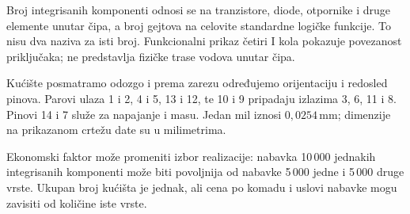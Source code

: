 
Broj integrisanih komponenti odnosi se na tranzistore, diode, otpornike i druge elemente unutar čipa, a broj gejtova na celovite standardne logičke funkcije. To nisu dva naziva za isti broj. Funkcionalni prikaz četiri I kola pokazuje povezanost priključaka; ne predstavlja fizičke trase vodova unutar čipa.

Kućište posmatramo odozgo i prema zarezu određujemo orijentaciju i redosled pinova. Parovi ulaza 1 i 2, 4 i 5, 13 i 12, te 10 i 9 pripadaju izlazima 3, 6, 11 i 8. Pinovi 14 i 7 služe za napajanje i masu. Jedan mil iznosi \(0{,}0254\,\mathrm{mm}\); dimenzije na prikazanom crtežu date su u milimetrima.

Ekonomski faktor može promeniti izbor realizacije: nabavka 10\,000 jednakih integrisanih komponenti može biti povoljnija od nabavke 5\,000 jedne i 5\,000 druge vrste. Ukupan broj kućišta je jednak, ali cena po komadu i uslovi nabavke mogu zavisiti od količine iste vrste.
